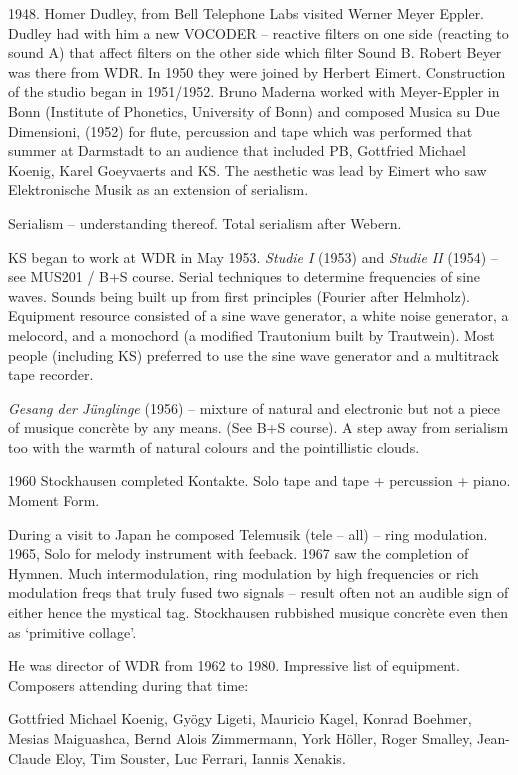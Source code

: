 1948. Homer Dudley, from Bell Telephone Labs visited Werner Meyer Eppler.  Dudley had with him a new VOCODER – reactive filters on one side (reacting to sound A) that affect filters on the other side which filter Sound B. Robert Beyer was there from WDR. In 1950 they were joined by Herbert Eimert. Construction of the studio began in 1951/1952.  Bruno Maderna worked with Meyer-Eppler in Bonn (Institute of Phonetics, University of Bonn) and composed Musica su Due Dimensioni, (1952) for flute, percussion and tape which was performed that summer at Darmstadt to an audience that included PB, Gottfried Michael Koenig, Karel Goeyvaerts and KS.  The aesthetic was lead by Eimert who saw Elektronische Musik as an extension of serialism.

Serialism – understanding thereof.  Total serialism after Webern. 

KS began to work at WDR in May 1953.  \textit{Studie I} (1953) and \textit{Studie II} (1954) – see MUS201 / B+S course. Serial techniques to determine frequencies of sine waves.  Sounds being built up from first principles (Fourier after Helmholz).  Equipment resource consisted of a sine wave generator, a white noise generator, a melocord, and a monochord (a modified Trautonium built by Trautwein).  Most people (including KS) preferred to use the sine wave generator and a multitrack tape recorder.

\textit{Gesang der J\"unglinge} (1956) – mixture of natural and electronic but not a piece of musique concr\`ete by any means. (See B+S course).  A step away from serialism too with the warmth of natural colours and the pointillistic clouds.

1960 Stockhausen completed Kontakte.  Solo tape and tape + percussion + piano.  Moment Form.
 
During a visit to Japan he composed Telemusik (tele – all) – ring modulation.  1965, Solo for melody instrument with feeback.  1967 saw the completion of Hymnen.  Much intermodulation, ring modulation by high frequencies or rich modulation freqs that truly fused two signals – result often not an audible sign of either hence the mystical tag.  Stockhausen rubbished musique concr\`ete even then as `primitive collage'. 

He was director of WDR from 1962 to 1980.  Impressive list of equipment.  Composers attending during that time:

Gottfried Michael Koenig, Gyögy Ligeti, Mauricio Kagel, Konrad Boehmer, Mesias Maiguashca, Bernd Alois Zimmermann, York H\"oller, Roger Smalley, Jean-Claude Eloy, Tim Souster, Luc Ferrari, Iannis Xenakis.

